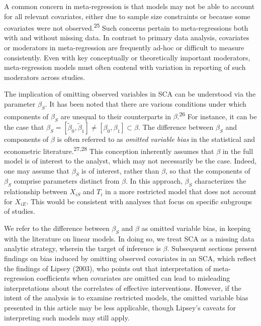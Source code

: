 \documentclass[
]{article}
\begin{document}
A common concern in meta-regression is that models may not be able to account for all relevant covariates, either due to sample size constraints or because some covariates were not observed.\textsuperscript{25}
Such concerns pertain to meta-regressions both with and without missing data.
In contrast to primary data analysis, covariates or moderators in meta-regression are frequently ad-hoc or difficult to measure consistently.
Even with key conceptually or theoretically important moderators, meta-regression models must often contend with variation in reporting of such moderators across studies.

The implication of omitting observed variables in SCA can be understood via the parameter \(\beta_S\).
It has been noted that there are various conditions under which components of \(\beta_S\) are unequal to their counterparts in \(\beta\).\textsuperscript{26}
For instance, it can be the case that \(\beta_S = [\tilde{\beta}_0, \tilde{\beta}_1] \neq [\beta_0, \beta_1] \subset \beta\).
The difference between \(\beta_S\) and components of \(\beta\) is often referred to as \emph{omitted variable bias} in the statistical and econometric literature.\textsuperscript{27,28}
This conception inherently assumes that \(\beta\) in the full model is of interest to the analyst, which may not necessarily be the case.
Indeed, one may assume that \(\beta_S\) is of interest, rather than \(\beta\), so that the components of \(\beta_S\) comprise parameters distinct from \(\beta\).
In this approach, \(\beta_S\) characterizes the relationship between \(X_{iS}\) and \(T_i\) in a more restricted model that does not account for \(X_{iE}\).
This would be consistent with analyses that focus on specific subgroups of studies.

We refer to the difference between \(\beta_S\) and \(\beta\) as omitted variable bias, in keeping with the literature on linear models.
In doing so, we treat SCA as a missing data analytic strategy, wherein the target of inference is \(\beta\).
Subsequent sections present findings on bias induced by omitting observed covariates in an SCA, which reflect the findings of Lipsey (2003), who points out that interpretation of meta-regression coefficients when covariates are omitted can lead to misleading interpretations about the correlates of effective interventions.
However, if the intent of the analysis is to examine restricted models, the omitted variable bias presented in this article may be less applicable, though Lipsey's caveats for interpreting such models may still apply.
\end{document}

